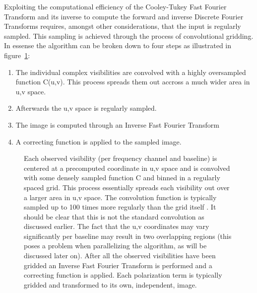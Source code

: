 \documentclass[a4paper,10pt]{report}
\begin{document}
 Exploiting the computational efficiency of the Cooley-Tukey Fast Fourier Transform and its inverse to compute the forward and inverse Discrete Fourier Transforms requires, amongst other considerations, that
 the input is regularly sampled. This sampling is achieved through the process of convolutional gridding. In essense the algorithm can be broken down to four steps as illustrated in figure~\ref{fig_gridding}:
 \begin{enumerate}
  \item The individual complex visibilities are convolved with a highly oversampled function C(u,v). This process spreads them out accross a much wider area in u,v space.
  \item Afterwards the u,v space is regularly sampled.
  \item The image is computed through an Inverse Fast Fourier Transform
  \item A correcting function is applied to the sampled image.
 \end{enumerate}
 \begin{figure}[h]
  \begin{mdframed}
   \caption[Illustration of convolutional gridding]{Each observed visibility (per frequency channel and baseline) is centered at a precomputed coordinate in u,v space and is convolved with 
    some densely sampled function C and binned in a regularly spaced grid. This process essentially spreads each visibility out over a larger area in u,v space. The convolution function is typically sampled
    up to 100 times more regularly than the grid itself \cite{varbanescu2008performance,cornwell2007impact}. It should be clear that this is not the standard convolution as discussed earlier. The fact that the u,v coordinates may vary 
    significantly per baseline may result in two overlapping regions (this poses a problem when parallelizing the algorithm, as will be discussed later on). After all the observed visibilities have been gridded an 
    Inverse Fast Fourier Transform is performed and a correcting function is applied. Each polarization term is typically gridded and transformed to its own, independent, image.}
   \label{fig_gridding}
  \end{mdframed}
 \end{figure}
\end{document}

